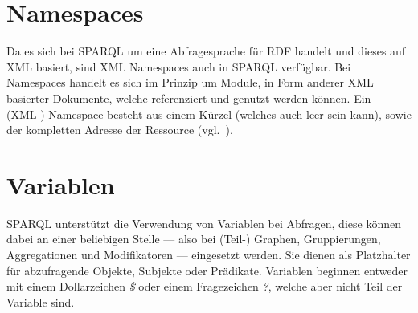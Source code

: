 \section{Namespaces}
\label{sec:sparql_namespaces}

Da es sich bei SPARQL um eine Abfragesprache für RDF handelt und dieses auf XML basiert, sind XML Namespaces auch in SPARQL verfügbar. Bei Namespaces handelt es sich im Prinzip um Module, in Form anderer XML basierter Dokumente, welche referenziert und genutzt werden können. Ein (XML-) Namespace besteht aus einem Kürzel (welches auch leer sein kann), sowie der kompletten Adresse der Ressource (vgl.~\cite[2.1 Introduction]{w3rdf_syntax}).


\section{Variablen}
\label{sec:sparql_variablen}

SPARQL unterstützt die Verwendung von Variablen bei Abfragen, diese können dabei an einer beliebigen Stelle --- also bei (Teil-) Graphen, Gruppierungen, Aggregationen und Modifikatoren --- eingesetzt werden.
Sie dienen als Platzhalter für abzufragende Objekte, Subjekte oder Prädikate. Variablen beginnen entweder mit einem Dollarzeichen \textit{\$} oder einem Fragezeichen \textit{?}, welche aber nicht Teil der Variable sind.

